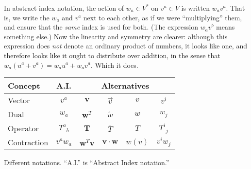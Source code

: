 \documentclass[10pt, a4paper]{article}
\begin{document}
In abstract index notation, the action of $w_a\in V^*$ on $v^a\in V$ is
written $w_av^a$. That is, we write the $w_a$ and $v^a$ next to each
other, as if we were “multiplying” them, and ensure that the
\emph{same} index is used for both. (The expression $w_av^b$ means
something else.) Now the linearity and symmetry are clearer: although
this expression does \emph{not} denote an ordinary product of numbers,
it looks like one, and therefore looks like it ought to distribute
over addition, in the sense that $w_a(u^a+v^a) = w_au^a +
w_av^a$. Which it does.

\begin{margintable}
  \centering
\renewcommand{\arraystretch}{1.2}
\begin{tabular}{@{}lc|cccc@{}}
    \toprule
    Concept & A.I. & \multicolumn{4}{c}{Alternatives} \\
    \midrule
  Vector      & $v^a$      & $\mathbold{v}$   & $\vec{v}$     & $v$ & $v^i$ \\
  Dual        & $w_a$      & $\mathbold{w}^T$ & $\tilde{w}$   & $w$ & $w_j$ \\
  Operator    & $T^a{}_b$  & $\mathbold{T}$   & $\overline{T}$ & $T$ & $T^i{}_j$ \\
  Contraction & $v^a w_a$  & $\mathbold{w}^T\mathbold{v}$ 
              & $\mathbold{v}\cdot\mathbold{w}$ & $w(v)$ & $v^iw_j$ \\   
  \bottomrule
  \end{tabular}
  \caption{Different notations. “A.I.” is “Abstract Index notation.”}
  \label{tab:notation}
\end{margintable}
\end{document}

